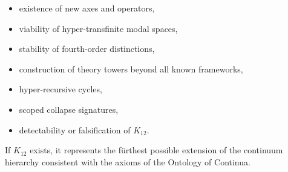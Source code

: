 \begin{itemize}
    \item existence of new axes and operators,
    \item viability of hyper-transfinite modal spaces,
    \item stability of fourth-order distinctions,
    \item construction of theory towers beyond all known frameworks,
    \item hyper-recursive cycles,
    \item scoped collapse signatures,
    \item detectability or falsification of $K_{12}$.
\end{itemize}

If $K_{12}$ exists, it represents the fürthest possible extension of 
the continuum hierarchy consistent with the axioms of the Ontology 
of Continua.
